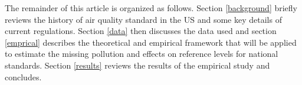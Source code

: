 


The remainder of this article is organized as follows. Section \ref{background} briefly reviews the history of air quality standard in the US and some key details of current regulations. Section \ref{data} then discusses the data used and section \ref{emprical} describes the theoretical and empirical framework that will be applied to estimate the missing pollution and effects on reference levels for national standards. Section \ref{results} reviews the results of the empirical study and concludes.
